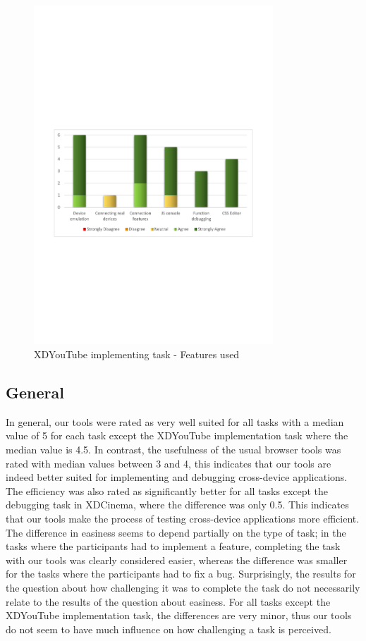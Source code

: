 \begin{figure}[H]
  \centering
    \includegraphics[width=0.8\textwidth]{images/charts/xdyt_impl_features_used.pdf}
	\caption{XDYouTube implementing task - Features used}
	\label{fig:xdyt_impl_features_used}
\end{figure}

\subsection{General}

In general, our tools were rated as very well suited for all tasks with a median value of 5 for each task except the XDYouTube implementation task where the median value is 4.5. In contrast, the usefulness of the usual browser tools was rated with median values between 3 and 4, this indicates that our tools are indeed better suited for implementing and debugging cross-device applications. The efficiency was also rated as significantly better for all tasks except the debugging task in XDCinema, where the difference was only 0.5. This indicates that our tools make the process of testing cross-device applications more efficient. The difference in easiness seems to depend partially on the type of task; in the tasks where the participants had to implement a feature, completing the task with our tools was clearly considered easier, whereas the difference was smaller for the tasks where the participants had to fix a bug. Surprisingly, the results for the question about how challenging it was to complete the task do not necessarily relate to the results of the question about easiness. For all tasks except the XDYouTube implementation task, the differences are very minor, thus our tools do not seem to have much influence on how challenging a task is perceived.

